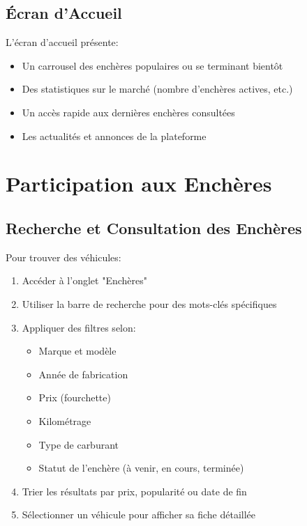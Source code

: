 \subsection{Écran d'Accueil}

L'écran d'accueil présente:

\begin{itemize}
    \item Un carrousel des enchères populaires ou se terminant bientôt
    \item Des statistiques sur le marché (nombre d'enchères actives, etc.)
    \item Un accès rapide aux dernières enchères consultées
    \item Les actualités et annonces de la plateforme
\end{itemize}

\section{Participation aux Enchères}

\subsection{Recherche et Consultation des Enchères}

Pour trouver des véhicules:

\begin{enumerate}
    \item Accéder à l'onglet "Enchères"
    \item Utiliser la barre de recherche pour des mots-clés spécifiques
    \item Appliquer des filtres selon:
    \begin{itemize}
        \item Marque et modèle
        \item Année de fabrication
        \item Prix (fourchette)
        \item Kilométrage
        \item Type de carburant
        \item Statut de l'enchère (à venir, en cours, terminée)
    \end{itemize}
    \item Trier les résultats par prix, popularité ou date de fin
    \item Sélectionner un véhicule pour afficher sa fiche détaillée
\end{enumerate}

